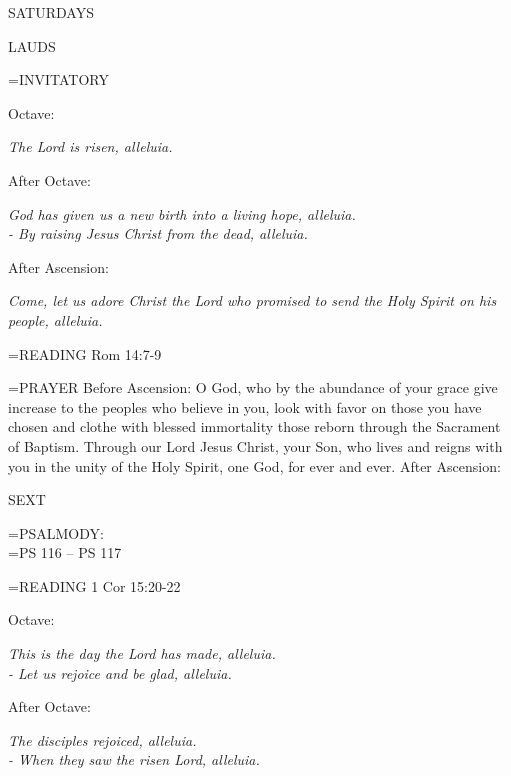 \begin{center}\normalsize SATURDAYS\\
\end{center}

\begin{flushleft}\normalsize LAUDS\\\end{flushleft}

\hangindent=\parindent \small{INVITATORY}
\begin{center}
\end{center}Octave:\begin{center}\textit{	The Lord is risen, alleluia.\\}
\end{center}After Octave:\begin{center}\textit{	God has given us a new birth into a living hope, alleluia.\\}
\textit{- By raising Jesus Christ from the dead, alleluia.\\}
\end{center}After Ascension:\begin{center}\textit{	Come, let us adore Christ the Lord who promised to send the Holy Spirit on his people, alleluia.\\}
\end{center}

\hangindent=\parindent \small{\uppercase{READING}}    Rom 14:7-9 \textbf{   \\}

\hangindent=\parindent \small{PRAYER }
Before Ascension:	O God, who by the abundance of your grace give increase to the peoples who believe in you, look with favor on those you have chosen and clothe with blessed immortality those reborn through the Sacrament of Baptism. Through our Lord Jesus Christ, your Son, who lives and reigns with you in the unity of the Holy Spirit, one God, for ever and ever.
After Ascension:	

\begin{flushleft}\normalsize SEXT\\\end{flushleft}

\hangindent=\parindent \small{PSALMODY:}\\
\hangindent=\parindent  PS 116 -- PS 117\vspace{0.5em}

\hangindent=\parindent \small{\uppercase{READING}}    1 Cor 15:20-22 \textbf{   \\}

\begin{center}
\end{center}Octave:\begin{center}\textit{	This is the day the Lord has made, alleluia.\\
- Let us rejoice and be glad, alleluia.}
\end{center}After Octave:\begin{center}\textit{	The disciples rejoiced, alleluia.\\
- When they saw the risen Lord, alleluia.}
\end{center}

